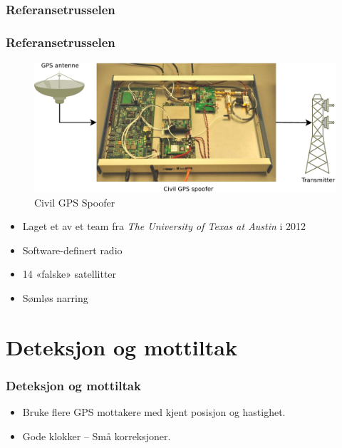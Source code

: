 \documentclass[xcolor=table]{beamer}
\begin{document}
\subsubsection{Referansetrusselen}
\begin{frame}
  \frametitle{Referansetrusselen}
  \begin{figure}
    \includegraphics[scale=0.2]{thesis/graphics/spoofer_diagram.pdf}
    \caption{Civil GPS Spoofer \cite{EVPMUGA}}
  \end{figure}
  \begin{itemize}
  \item Laget et av et team fra \textit{The University of Texas at Austin} i 2012
  \item Software-definert radio
  \item 14 «falske» satellitter
  \item Sømløs narring
  \end{itemize}
\end{frame}


\section{Deteksjon og mottiltak}
\begin{frame}
\frametitle{Deteksjon og mottiltak}
  \begin{itemize}
        \setlength\itemsep{2em}
      \item Bruke flere GPS mottakere med kjent posisjon og hastighet.
      \item Gode klokker -- Små korreksjoner.
    \end{itemize}
\end{frame}
\end{document}
